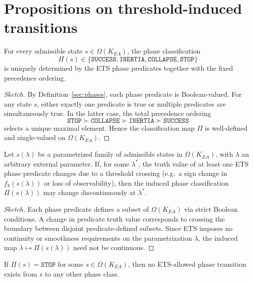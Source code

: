 ﻿\section{Propositions on threshold-induced transitions}
\label{sec:props}

\begin{proposition}
\label{prop:unique-phase}
For every admissible state $s \in \Omega(K_{EA})$, the phase classification
\[
\Pi(s) \in \{\texttt{SUCCESS}, \texttt{INERTIA}, \texttt{COLLAPSE}, \texttt{STOP}\}
\]
is uniquely determined by the ETS phase predicates together with the fixed
precedence ordering.
\end{proposition}

\begin{proof}[Sketch]
By Definition~\ref{sec:phases}, each phase predicate is Boolean-valued.
For any state $s$, either exactly one predicate is true or multiple predicates
are simultaneously true. In the latter case, the total precedence ordering
\[
\texttt{STOP} \succ \texttt{COLLAPSE} \succ \texttt{INERTIA} \succ \texttt{SUCCESS}
\]
selects a unique maximal element. Hence the classification map $\Pi$ is
well-defined and single-valued on $\Omega(K_{EA})$.
\end{proof}

\begin{proposition}
\label{prop:discontinuous}
Let $s(\lambda)$ be a parametrized family of admissible states in
$\Omega(K_{EA})$, with $\lambda$ an arbitrary external parameter.
If, for some $\lambda^\ast$, the truth value of at least one ETS phase predicate
changes due to a threshold crossing (e.g.\ a sign change in $f_k(s(\lambda))$ or
loss of observability), then the induced phase classification
$\Pi(s(\lambda))$ may change discontinuously at $\lambda^\ast$.
\end{proposition}

\begin{proof}[Sketch]
Each phase predicate defines a subset of $\Omega(K_{EA})$ via strict Boolean
conditions. A change in predicate truth value corresponds to crossing the
boundary between disjoint predicate-defined subsets. Since ETS imposes no
continuity or smoothness requirements on the parametrization $\lambda$,
the induced map $\lambda \mapsto \Pi(s(\lambda))$ need not be continuous.
\end{proof}

\begin{proposition}
\label{prop:stop-absorbing}
If $\Pi(s)=\texttt{STOP}$ for some $s \in \Omega(K_{EA})$, then no ETS-allowed
phase transition exists from $s$ to any other phase class.
\end{proposition}

